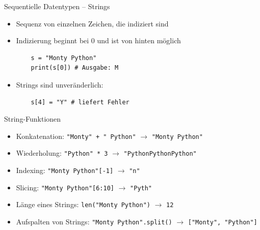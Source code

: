 \documentclass[utf8, smaller, c]{beamer}
\begin{document}
\begin{frame}{Sequentielle Datentypen -- Strings}
	\begin{itemize}
		\item Sequenz von einzelnen Zeichen, die indiziert sind
		\item Indizierung beginnt bei 0 und ist von hinten möglich
	\begin{verbatim}
	s = "Monty Python"
	print(s[0]) # Ausgabe: M
	\end{verbatim}
	\end{itemize}
	\begin{itemize}
		\item Strings sind unveränderlich: 
	\begin{verbatim}
	s[4] = "Y" # liefert Fehler
	\end{verbatim}
	\end{itemize}
	
	\pagebreak

	\begin{block}{String-Funktionen}
		\begin{itemize}
			\item Konkatenation:\newline
			\verb|"Monty" + " Python"| $\rightarrow$ \verb|"Monty Python"|
			\item Wiederholung:\newline
			\verb|"Python" * 3| $\rightarrow$ \verb|"PythonPythonPython"|
			\item Indexing:\newline
			\verb|"Monty Python"[-1]| $\rightarrow$ \verb|"n"|
			\item Slicing:\newline
			\verb|"Monty Python"[6:10]| $\rightarrow$ \verb|"Pyth"|
			\item Länge eines Strings:\newline
			\verb|len("Monty Python")| $\rightarrow$ \verb|12|
			\item Aufspalten von Strings:\newline
			\verb|"Monty Python".split()| $\rightarrow$ \verb|["Monty", "Python"]|
		\end{itemize}
	\end{block}
\end{frame}
\end{document}
